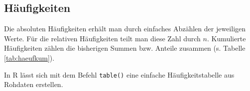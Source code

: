 \documentclass[
  11pt,
  ngerman,
  a4paper,
]{report}
\newenvironment{rtip}{
  \medskip
  \begin{tcolorbox}[colframe=purple,colback=light_gray,title=Softwarehinweis]
}{
  \end{tcolorbox}
  \medskip
}
\begin{document}
\hypertarget{huxe4ufigkeiten}{%
\subsection{Häufigkeiten}\label{huxe4ufigkeiten}}

Die absoluten Häufigkeiten erhält man durch einfaches Abzählen der jeweiligen Werte. Für die relativen Häufigkeiten teilt man diese Zahl durch \(n\). Kumulierte Häufigkeiten zählen die bisherigen Summen bzw. Anteile zusammen (s. Tabelle \ref{tab:haeufkum}).

\begin{rtip}
In R lässt sich mit dem Befehl \verb|table()| eine einfache Häufigkeitstabelle aus Rohdaten erstellen.
\end{rtip}

\begin{table}


\end{table}
\end{document}
